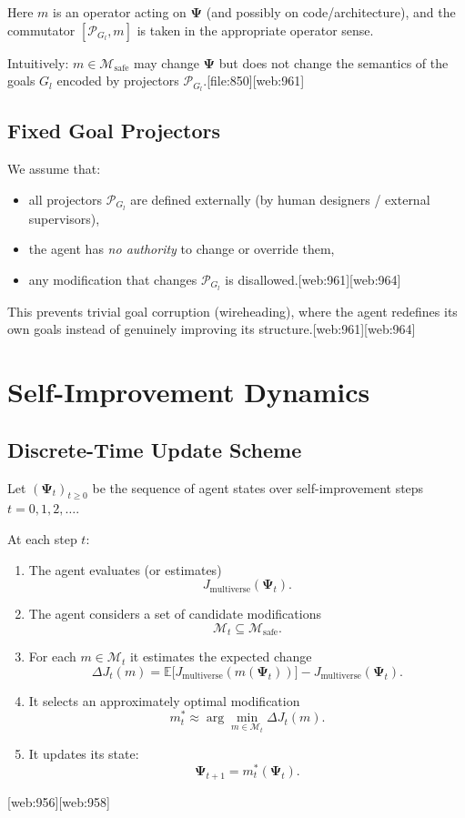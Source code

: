 \documentclass[12pt]{article}
\begin{document}
Here $m$ is an operator acting on $\bm{\Psi}$ (and possibly on code/architecture),
and the commutator $[\mathcal{P}_{G_l}, m]$ is taken in the appropriate
operator sense.

Intuitively: $m \in \mathcal{M}_{\text{safe}}$ may change $\bm{\Psi}$ but does
not change the semantics of the goals $G_l$ encoded by projectors
$\mathcal{P}_{G_l}$.[file:850][web:961]

\subsection{Fixed Goal Projectors}

We assume that:
\begin{itemize}
  \item all projectors $\mathcal{P}_{G_l}$ are defined externally
        (by human designers / external supervisors),
  \item the agent has \emph{no authority} to change or override them,
  \item any modification that changes $\mathcal{P}_{G_l}$ is disallowed.[web:961][web:964]
\end{itemize}

This prevents trivial goal corruption (wireheading), where the agent
redefines its own goals instead of genuinely improving its structure.[web:961][web:964]

\section{Self-Improvement Dynamics}

\subsection{Discrete-Time Update Scheme}

Let $(\bm{\Psi}_t)_{t \ge 0}$ be the sequence of agent states over
self-improvement steps $t = 0,1,2,\dots$.

At each step $t$:
\begin{enumerate}
  \item The agent evaluates (or estimates)
    \[
    J_{\text{multiverse}}(\bm{\Psi}_t).
    \]
  \item The agent considers a set of candidate modifications
    \[
    \mathcal{M}_t \subseteq \mathcal{M}_{\text{safe}}.
    \]
  \item For each $m \in \mathcal{M}_t$ it estimates the expected change
    \[
    \Delta J_t(m) =
    \mathbb{E}\big[
      J_{\text{multiverse}}(m(\bm{\Psi}_t))
    \big]
    -
    J_{\text{multiverse}}(\bm{\Psi}_t).
    \]
  \item It selects an approximately optimal modification
    \[
    m_t^* \approx
    \arg\min_{m \in \mathcal{M}_t}
    \Delta J_t(m).
    \]
  \item It updates its state:
    \[
    \bm{\Psi}_{t+1} = m_t^*(\bm{\Psi}_t).
    \]
\end{enumerate}[web:956][web:958]
\end{document}
